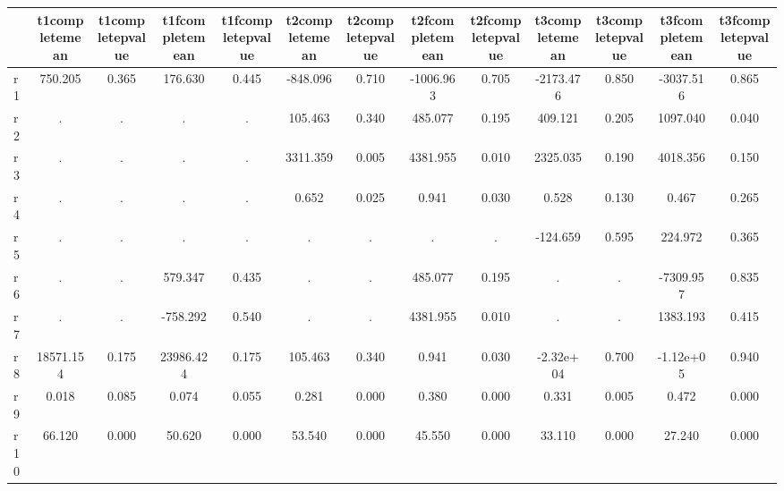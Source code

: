 \begin{table}[htbp]
\begin{tabular}{lcccccccccccc} \hline \hline
 & t1completemean  & t1completepvalue  & t1fcompletemean  & t1fcompletepvalue  & t2completemean  & t2completepvalue  & t2fcompletemean  & t2fcompletepvalue  & t3completemean  & t3completepvalue  & t3fcompletemean  & t3fcompletepvalue  \\  \hline 
r1 &   750.205 &     0.365 &   176.630 &     0.445 &  -848.096 &     0.710 & -1006.963 &     0.705 & -2173.476 &     0.850 & -3037.516 &     0.865 \\  
r2 &         . &         . &         . &         . &   105.463 &     0.340 &   485.077 &     0.195 &   409.121 &     0.205 &  1097.040 &     0.040 \\  
r3 &         . &         . &         . &         . &  3311.359 &     0.005 &  4381.955 &     0.010 &  2325.035 &     0.190 &  4018.356 &     0.150 \\  
r4 &         . &         . &         . &         . &     0.652 &     0.025 &     0.941 &     0.030 &     0.528 &     0.130 &     0.467 &     0.265 \\  
r5 &         . &         . &         . &         . &         . &         . &         . &         . &  -124.659 &     0.595 &   224.972 &     0.365 \\  
r6 &         . &         . &   579.347 &     0.435 &         . &         . &   485.077 &     0.195 &         . &         . & -7309.957 &     0.835 \\  
r7 &         . &         . &  -758.292 &     0.540 &         . &         . &  4381.955 &     0.010 &         . &         . &  1383.193 &     0.415 \\  
r8 & 18571.154 &     0.175 & 23986.424 &     0.175 &   105.463 &     0.340 &     0.941 &     0.030 & -2.32e+04 &     0.700 & -1.12e+05 &     0.940 \\  
r9 &     0.018 &     0.085 &     0.074 &     0.055 &     0.281 &     0.000 &     0.380 &     0.000 &     0.331 &     0.005 &     0.472 &     0.000 \\  
r10 &    66.120 &     0.000 &    50.620 &     0.000 &    53.540 &     0.000 &    45.550 &     0.000 &    33.110 &     0.000 &    27.240 &     0.000 \\  
\hline \hline \end{tabular}
\end{table}
